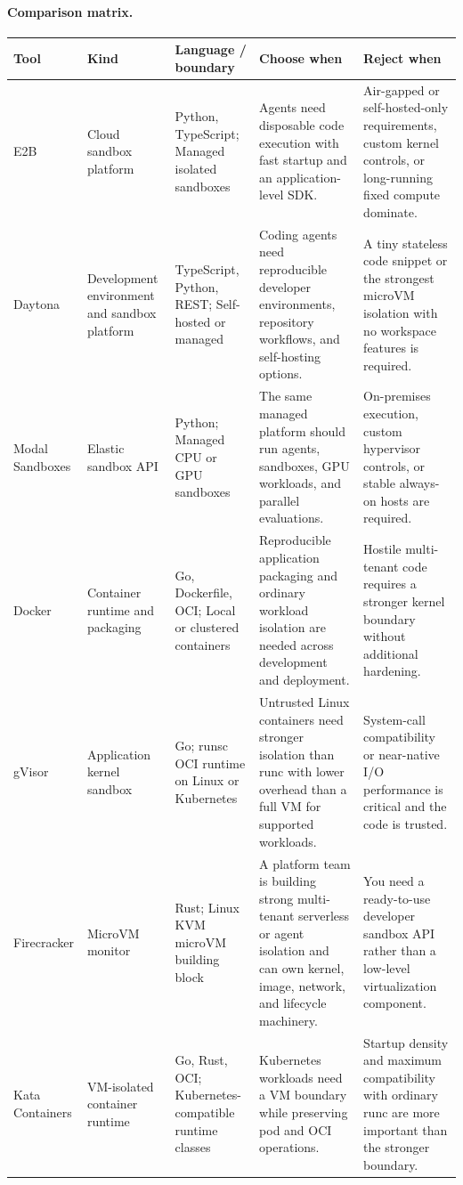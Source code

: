 \paragraph{Comparison matrix.}
\begin{longtable}{@{}p{20mm}p{22mm}p{26mm}p{46mm}p{46mm}@{}}
\toprule\textbf{Tool} & \textbf{Kind} & \textbf{Language / boundary} & \textbf{Choose when} & \textbf{Reject when}\\\midrule\endhead
E2B & Cloud sandbox platform & Python, TypeScript; Managed isolated sandboxes & Agents need disposable code execution with fast startup and an application-level SDK. & Air-gapped or self-hosted-only requirements, custom kernel controls, or long-running fixed compute dominate.\\
Daytona & Development environment and sandbox platform & TypeScript, Python, REST; Self-hosted or managed & Coding agents need reproducible developer environments, repository workflows, and self-hosting options. & A tiny stateless code snippet or the strongest microVM isolation with no workspace features is required.\\
Modal Sandboxes & Elastic sandbox API & Python; Managed CPU or GPU sandboxes & The same managed platform should run agents, sandboxes, GPU workloads, and parallel evaluations. & On-premises execution, custom hypervisor controls, or stable always-on hosts are required.\\
Docker & Container runtime and packaging & Go, Dockerfile, OCI; Local or clustered containers & Reproducible application packaging and ordinary workload isolation are needed across development and deployment. & Hostile multi-tenant code requires a stronger kernel boundary without additional hardening.\\
gVisor & Application kernel sandbox & Go; runsc OCI runtime on Linux or Kubernetes & Untrusted Linux containers need stronger isolation than runc with lower overhead than a full VM for supported workloads. & System-call compatibility or near-native I/O performance is critical and the code is trusted.\\
Firecracker & MicroVM monitor & Rust; Linux KVM microVM building block & A platform team is building strong multi-tenant serverless or agent isolation and can own kernel, image, network, and lifecycle machinery. & You need a ready-to-use developer sandbox API rather than a low-level virtualization component.\\
Kata Containers & VM-isolated container runtime & Go, Rust, OCI; Kubernetes-compatible runtime classes & Kubernetes workloads need a VM boundary while preserving pod and OCI operations. & Startup density and maximum compatibility with ordinary runc are more important than the stronger boundary.\\

\end{longtable}
